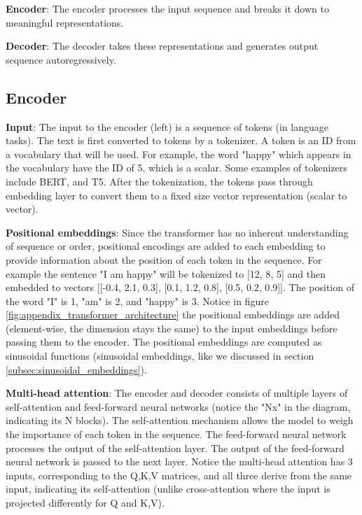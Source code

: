 \textbf{Encoder}: The encoder processes the input sequence and breaks it down to meaningful representations.

\textbf{Decoder}: The decoder takes these representations and generates output sequence autoregressively. 

\subsection*{Encoder}

\textbf{Input}: The input to the encoder (left) is a sequence of tokens (in language tasks). The text is first converted to tokens by a tokenizer. A token is an ID from a vocabulary that will be used. For example, the word "happy" which appears in the vocabulary have the ID of 5, which is a scalar. Some examples of tokenizers include BERT, and T5. After the tokenization, the tokens pass through embedding layer to convert them to a fixed size vector representation (scalar to vector). 

\textbf{Positional embeddings}: Since the transformer has no inherent understanding of sequence or order, positional encodings are added to each embedding to provide information about the position of each token in the sequence. For example the sentence "I am happy" will be tokenized to [12, 8, 5] and then embedded to vectors [[-0.4, 2.1, 0.3], [0.1, 1.2, 0.8], [0.5, 0.2, 0.9]]. The position of the word "I" is 1, "am" is 2, and "happy" is 3. Notice in figure \ref{fig:appendix_transformer_architecture} the positional embeddings are added (element-wise, the dimension stays the same) to the input embeddings before passing them to the encoder. The positional embeddings are computed as sinusoidal functions (sinusoidal embeddings, like we discussed in section \ref{subsec:sinusoidal_embeddings}).

\textbf{Multi-head attention}: The encoder and decoder consists of multiple layers of self-attention and feed-forward neural networks (notice the "Nx" in the diagram, indicating its N blocks). The self-attention mechanism allows the model to weigh the importance of each token in the sequence. The feed-forward neural network processes the output of the self-attention layer. The output of the feed-forward neural network is passed to the next layer. Notice the multi-head attention has 3 inputs, corresponding to the Q,K,V matrices, and all three derive from the same input, indicating its self-attention (unlike cross-attention where the input is projected differently for Q and K,V).

